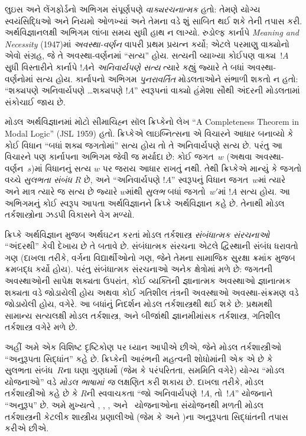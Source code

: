 લુઇસ અને લેંગફોર્ડનો અભિગમ સંપૂર્ણપણે \emph{વાક્યરચનાત્મક}
હતો: તેમણે યોગ્ય સ્વયંસિદ્ધિઓ અને નિયમો ઓળખ્યાં અને
તેમના વડે શું સાબિત થઈ શકે તેની તપાસ કરી. અર્થવિજ્ઞાનલક્ષી
અભિગમ લાંબા સમય સુધી હાથ ન લાગ્યો. રુડોલ્ફ કાર્નાપે
\emph{Meaning and Necessity} (1947)માં \emph{અવસ્થા-વર્ણન}
વાપરી પ્રથમ પ્રયત્ન કર્યો; એટલે પરમાણુ વાક્યોનો એવો સંગ્રહ,
જે તે અવસ્થા-વર્ણનમાં ``સત્ય'' હોય. સત્યની વ્યાખ્યા કોઈપણ
વાક્ય~$!A$ સુધી વિસ્તારીને કાર્નાપે $!A$ને \emph{અનિવાર્યપણે
સત્ય} ત્યારે કહ્યું જ્યારે તે બધાં અવસ્થા-વર્ણનોમાં સત્ય હોય.
કાર્નાપનો અભિગમ \emph{પુનરાવર્તિત} મોડલતાઓને સંભાળી શકતો
ન હતો: ``શક્યપણે અનિવાર્યપણે \ldots શક્યપણે $!A$''
સ્વરૂપનાં વાક્યો હંમેશા સૌથી અંદરની મોડલતામાં સંકોચાઈ જાય છે.

મોડલ અર્થવિજ્ઞાનમાં મોટો સીમાચિહ્ન સૉલ ક્રિપ્કેનો લેખ
``A Completeness Theorem in Modal Logic'' (JSL 1959) હતો.
ક્રિપ્કેએ લાઇબ્નિત્સના એ વિચારને આધાર બનાવ્યો કે કોઈ વિધાન
``બધાં શક્ય જગતોમાં'' સત્ય હોય તો તે અનિવાર્યપણે સત્ય છે.
પરંતુ આ વિચારને પણ કાર્નાપના અભિગમ જેવી જ મર્યાદા છે:
કોઈ જગત~$w$ (અથવા અવસ્થા-વર્ણન~$s$)માં વિધાનનું સત્ય
$w$ પર જરાય આધાર રાખતું નથી. તેથી ક્રિપ્કેએ માન્યું કે
જગતો વચ્ચે \emph{સુલભતા સંબંધ} $R$ છે, અને
``અનિવાર્યપણે $!A$'' સ્વરૂપનું વિધાન જગત~$w$માં ત્યારે અને
માત્ર ત્યારે જ સત્ય છે જ્યારે $w$માંથી \emph{સુલભ}
બધાં જગતો~$w'$માં $!A$ સત્ય હોય. આ અભિગમનું કોઈ સ્વરૂપ
આપતા અર્થવિજ્ઞાનને ક્રિપ્કે અર્થવિજ્ઞાન કહે છે. તેનાથી
મોડલ તર્કશાસ્ત્રોના ઝડપી વિકાસને વેગ મળ્યો.

ક્રિપ્કે અર્થવિજ્ઞાન મુજબ અર્થઘટન કરતાં મોડલ તર્કશાસ્ત્ર
\emph{સંબંધાત્મક સંરચનાઓ} ``અંદરથી'' કેવી દેખાય છે તે બતાવે છે.
સંબંધાત્મક સંરચના એટલે દ્વિસ્થાની સંબંધ ધરાવતો ગણ
(દાખલા તરીકે, વર્ગના વિદ્યાર્થીઓનો ગણ, જેને તેમના
સામાજિક સુરક્ષા ક્રમાંક મુજબ ક્રમબદ્ધ કર્યો હોય).
પરંતુ સંબંધાત્મક સંરચનાઓ અનેક ક્ષેત્રોમાં મળે છે:
જગતની અવસ્થાઓની સાપેક્ષ શક્યતા ઉપરાંત, કોઈ વ્યક્તિની
જ્ઞાનાત્મક અવસ્થાઓ જ્ઞાનાત્મક શક્યતા વડે જોડાયેલી હોય
અથવા કોઈ ગતિશીલ તંત્રની અવસ્થાઓ અવસ્થા-સંક્રમણ વડે
જોડાયેલી હોય, વગેરે. આ બધાંનું નિદર્શન મોડલ તર્કશાસ્ત્રથી
થઈ શકે છે: પ્રથમથી સામાન્ય સત્યલક્ષી મોડલ તર્કશાસ્ત્ર,
અને બીજાંથી જ્ઞાનમીમાંસક તર્કશાસ્ત્ર, ગતિશીલ તર્કશાસ્ત્ર
વગેરે મળે છે.

અહીં અમે એક વિશિષ્ટ દૃષ્ટિકોણ પર ધ્યાન આપીએ છીએ, જેને
મોડલ તર્કશાસ્ત્રીઓ ``અનુરૂપતા સિદ્ધાંત'' કહે છે. ક્રિપ્કેની
આરંભની મહત્વની શોધોમાંની એક એ છે કે સુલભતા સંબંધ~$R$ના
ઘણા ગુણધર્મો (જેમ કે પરંપરિતતા, સમમિતિ વગેરે) યોગ્ય
``મોડલ યોજનાઓ'' વડે \emph{મોડલ ભાષામાં જ} લક્ષણિત કરી
શકાય છે. દાખલા તરીકે, મોડલ તર્કશાસ્ત્રીઓ કહે છે કે
$R$ની સ્વવાચકતા ``જો અનિવાર્યપણે~$!A$, તો~$!A$''
યોજનાને ``અનુરૂપ'' છે. અમે મુખ્યત્વે , ,
,  અને~ યોજનાઓના સંયોજનથી મળતી
મોડલ તર્કશાસ્ત્રની કેટલીક શાસ્ત્રીય પ્રણાલીઓ (જેમ કે
 અને )ના અનુરૂપતા સિદ્ધાંતની તપાસ કરીએ છીએ.
\endgroup

